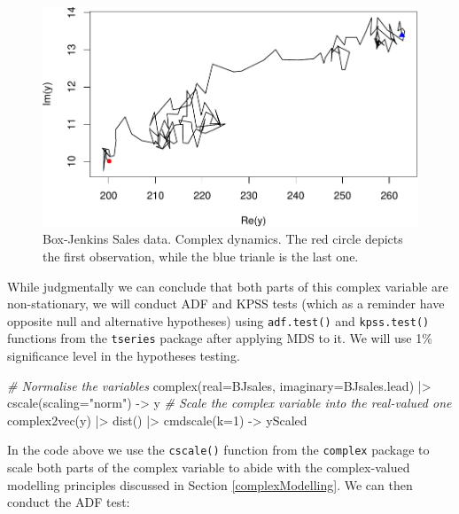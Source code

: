 \documentclass[
]{book}
\newenvironment{Shaded}{\begin{snugshade}}{\end{snugshade}}
\newcommand{\AttributeTok}[1]{\textcolor[rgb]{0.77,0.63,0.00}{#1}}
\newcommand{\CommentTok}[1]{\textcolor[rgb]{0.56,0.35,0.01}{\textit{#1}}}
\newcommand{\DecValTok}[1]{\textcolor[rgb]{0.00,0.00,0.81}{#1}}
\newcommand{\FunctionTok}[1]{\textcolor[rgb]{0.00,0.00,0.00}{#1}}
\newcommand{\NormalTok}[1]{#1}
\newcommand{\OtherTok}[1]{\textcolor[rgb]{0.56,0.35,0.01}{#1}}
\newcommand{\SpecialCharTok}[1]{\textcolor[rgb]{0.00,0.00,0.00}{#1}}
\newcommand{\StringTok}[1]{\textcolor[rgb]{0.31,0.60,0.02}{#1}}
\begin{document}
\begin{figure}
\centering
\includegraphics{Svetunkov---Svetunkov---Complex-Valued-Econometrics_files/figure-latex/BJSalesComplex-1.pdf}
\caption{\label{fig:BJSalesComplex}Box-Jenkins Sales data. Complex dynamics. The red circle depicts the first observation, while the blue trianle is the last one.}
\end{figure}

While judgmentally we can conclude that both parts of this complex variable are non-stationary, we will conduct ADF and KPSS tests (which as a reminder have opposite null and alternative hypotheses) using \texttt{adf.test()} and \texttt{kpss.test()} functions from the \texttt{tseries} package after applying MDS to it. We will use 1\% significance level in the hypotheses testing.

\begin{Shaded}
\begin{Highlighting}[]
\CommentTok{\# Normalise the variables}
\FunctionTok{complex}\NormalTok{(}\AttributeTok{real=}\NormalTok{BJsales, }\AttributeTok{imaginary=}\NormalTok{BJsales.lead) }\SpecialCharTok{|\textgreater{}}
    \FunctionTok{cscale}\NormalTok{(}\AttributeTok{scaling=}\StringTok{"norm"}\NormalTok{) }\OtherTok{{-}\textgreater{}}\NormalTok{ y}
\CommentTok{\# Scale the complex variable into the real{-}valued one}
\FunctionTok{complex2vec}\NormalTok{(y) }\SpecialCharTok{|\textgreater{}} \FunctionTok{dist}\NormalTok{() }\SpecialCharTok{|\textgreater{}} \FunctionTok{cmdscale}\NormalTok{(}\AttributeTok{k=}\DecValTok{1}\NormalTok{) }\OtherTok{{-}\textgreater{}}\NormalTok{ yScaled}
\end{Highlighting}
\end{Shaded}

In the code above we use the \texttt{cscale()} function from the \texttt{complex} package to scale both parts of the complex variable to abide with the complex-valued modelling principles discussed in Section \ref{complexModelling}. We can then conduct the ADF test:
\end{document}
